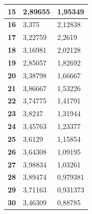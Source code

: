 \documentclass[a4paper]{article}
\begin{document}
\begin{table}[]
\begin{tabular}{|l|l|l|}
\textbf{15}     & 2,89655                                      & 1,95349                                          \\ \hline
\textbf{16}     & 3,375                                        & 2,12838                                          \\ \hline
\textbf{17}     & 3,22759                                      & 2,2619                                           \\ \hline
\textbf{18}     & 3,16981                                      & 2,02128                                          \\ \hline
\textbf{19}     & 2,85057                                      & 1,82692                                          \\ \hline
\textbf{20}     & 3,38798                                      & 1,66667                                          \\ \hline
\textbf{21}     & 3,86667                                      & 1,53226                                          \\ \hline
\textbf{22}     & 3,74775                                      & 1,41791                                          \\ \hline
\textbf{23}     & 3,8247                                       & 1,31944                                          \\ \hline
\textbf{24}     & 3,45763                                      & 1,23377                                          \\ \hline
\textbf{25}     & 3,6129                                       & 1,15854                                          \\ \hline
\textbf{26}     & 3,64308                                      & 1,09195                                          \\ \hline
\textbf{27}     & 3,98834                                      & 1,03261                                          \\ \hline
\textbf{28}     & 3,89474                                      & 0,979381                                         \\ \hline
\textbf{29}     & 3,71163                                      & 0,931373                                         \\ \hline
\textbf{30}     & 3,46309                                      & 0,88785                                          \\ \hline

\end{tabular}
\end{table}
\end{document}
